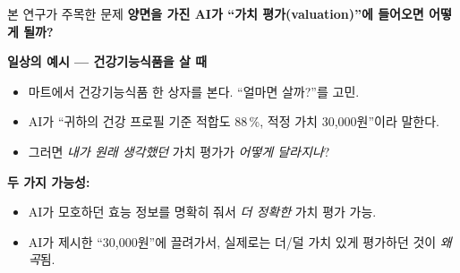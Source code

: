 \documentclass[aspectratio=169]{beamer}
\begin{document}
\begin{frame}{본 연구가 주목한 문제}
  \textbf{양면을 가진 AI가 ``가치 평가(valuation)''에 들어오면 어떻게 될까?}

  \vspace{0.5em}
  \textbf{일상의 예시 --- 건강기능식품을 살 때}
  \begin{itemize}\itemsep0.2em
    \item 마트에서 건강기능식품 한 상자를 본다. ``얼마면 살까?''를 고민.
    \item AI가 ``귀하의 건강 프로필 기준 적합도 88\,\%, 적정 가치 30,000원''이라 말한다.
    \item 그러면 \emph{내가 원래 생각했던} 가치 평가가 \emph{어떻게 달라지나}?
  \end{itemize}

  \vspace{0.6em}
  \textbf{두 가지 가능성:}
  \begin{itemize}\itemsep0.15em
    \item {} AI가 모호하던 효능 정보를 명확히 줘서 \emph{더 정확한} 가치 평가 가능.
    \item {} AI가 제시한 ``30,000원''에 끌려가서, 실제로는 더/덜 가치 있게 평가하던 것이 \emph{왜곡}됨.
  \end{itemize}

  \vspace{0.4em}
\end{frame}
\end{document}

